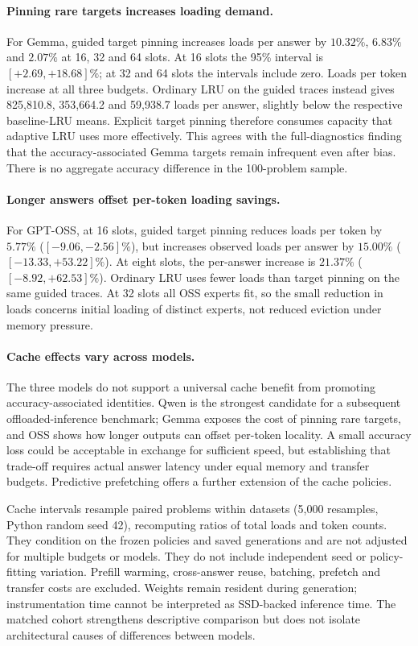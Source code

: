\documentclass[12pt,a4paper,twoside,openright]{book}
\begin{document}
\paragraph{Pinning rare targets increases loading demand.}
For Gemma, guided target pinning increases loads per answer by $10.32\%$, $6.83\%$
and $2.07\%$ at 16, 32 and 64 slots. At 16 slots the 95\% interval is
$[+2.69,+18.68]\%$; at 32 and 64 slots the intervals include zero.
Loads per token increase at all three budgets. Ordinary LRU on the guided
traces instead gives 825,810.8, 353,664.2 and 59,938.7 loads per answer,
slightly below the respective baseline-LRU means. Explicit target pinning
therefore consumes capacity that adaptive LRU uses more effectively.
This agrees with the full-diagnostics finding that the accuracy-associated
Gemma targets remain infrequent even after bias. There is no aggregate
accuracy difference in the 100-problem sample.

\paragraph{Longer answers offset per-token loading savings.}
For GPT-OSS, at 16 slots, guided target pinning reduces loads per token by
$5.77\%$ ($[-9.06,-2.56]\%$), but increases observed loads per answer by
$15.00\%$ ($[-13.33,+53.22]\%$). At eight slots, the per-answer increase is
$21.37\%$ ($[-8.92,+62.53]\%$). Ordinary LRU uses fewer loads than target
pinning on the same guided traces. At 32 slots all OSS experts fit, so the
small reduction in loads concerns initial loading of distinct experts, not
reduced eviction under memory pressure.

\paragraph{Cache effects vary across models.}
The three models do not support a universal cache benefit from promoting
accuracy-associated identities. Qwen is the strongest candidate for a
subsequent offloaded-inference benchmark; Gemma exposes the cost of pinning
rare targets, and OSS shows how longer outputs can offset per-token locality.
A small accuracy loss could be acceptable in exchange for sufficient speed,
but establishing that trade-off requires actual answer latency under equal
memory and transfer budgets. Predictive prefetching offers a further extension
of the cache policies.

Cache intervals resample paired problems within datasets (5,000 resamples,
Python random seed 42), recomputing ratios of total loads and token counts.
They condition on the frozen policies and saved generations and are not
adjusted for multiple budgets or models. They do not include independent
seed or policy-fitting variation. Prefill warming, cross-answer reuse,
batching, prefetch and transfer costs are excluded. Weights remain resident
during generation; instrumentation time cannot be interpreted as SSD-backed
inference time. The matched cohort strengthens descriptive comparison but
does not isolate architectural causes of differences between models.
\end{document}

